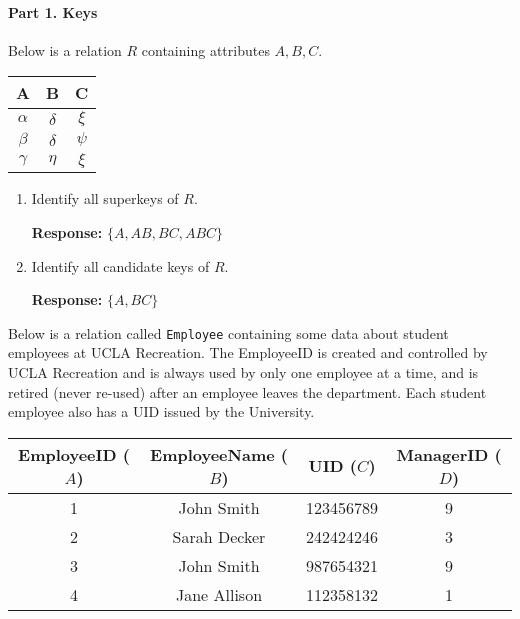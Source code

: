 \documentclass{report}
\renewcommand{\bf}[1]{\textbf{{#1}}}
\renewcommand{\tt}[1]{\texttt{{#1}}}
\begin{document}
\paragraph{Part 1. Keys}\mbox{} \vspace{10pt}

\noindent Below is a relation $R$ containing attributes $A, B, C$.
\begin{center}
    \begin{tabular}{c|c|c}
        A & B & C \\
        \hline
        $\alpha$ & $\delta$ & $\xi$ \\
        $\beta$ & $\delta$ & $\psi$ \\
        $\gamma$ & $\eta$ & $\xi$
    \end{tabular}
\end{center}

\begin{enumerate}[label=(\alph*)]
    \item Identify all superkeys of $R$. \vspace{2pt}

        \bf{Response:} $\{A, AB, BC, ABC\}$

    \item Identify all candidate keys of $R$. \vspace{2pt}

        \bf{Response:} $\{A, BC\}$
\end{enumerate}

\noindent Below is a relation called \tt{Employee} containing some data about student employees at UCLA 
Recreation. The EmployeeID is created and controlled by UCLA Recreation and is always used 
by only one employee at a time, and is retired (never re-used) after an employee leaves the 
department. Each student employee also has a UID issued by the University.

\begin{table}[h!]
    \centering
    \begin{tabular}{|c|c|c|c|}
        \hline
        \hline
        EmployeeID ($A$) & EmployeeName ($B$) & UID ($C$) & ManagerID ($D$) \\
        \hline
        1 & John Smith  & 123456789 & 9 \\
        \hline
        2 & Sarah Decker & 242424246 & 3 \\
        \hline
        3 & John Smith  & 987654321 & 9 \\
        \hline
        4 & Jane Allison & 112358132 & 1 \\
        \hline
        \hline
    \end{tabular}
\end{table}
\end{document}
